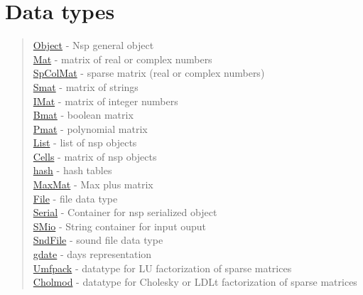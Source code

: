 \chapter*{Data types}


\begin{quote}
\noindent
\hyperlink{Object}{Object} - Nsp general object  \\
\hyperlink{Mat}{Mat} - matrix of real or complex numbers \\
\hyperlink{SpColMat}{SpColMat} - sparse matrix (real or complex numbers) \\
\hyperlink{Smat}{Smat} - matrix of strings  \\
\hyperlink{IMat}{IMat} - matrix of integer numbers \\
\hyperlink{Bmat}{Bmat} - boolean matrix  \\
\hyperlink{Pmat}{Pmat} - polynomial matrix  \\
\hyperlink{list}{List} - list  of nsp objects  \\
\hyperlink{Cells}{Cells} - matrix of nsp objects  \\
\hyperlink{hash}{hash} - hash tables  \\
\hyperlink{MaxMat}{MaxMat} - Max plus matrix  \\
\hyperlink{File}{File} - file data type  \\
\hyperlink{Serial}{Serial} - Container for nsp serialized object \\
\hyperlink{SMio}{SMio} - String container for input ouput \\
\hyperlink{SndFile}{SndFile} - sound file data type \\
\hyperlink{gdate}{gdate} - days representation \\
\hyperlink{Umfpack}{Umfpack} - datatype for LU factorization of sparse matrices \\
\hyperlink{Cholmod}{Cholmod} - datatype for Cholesky or LDLt factorization of sparse matrices \\
\end{quote}


 
 
 
 
 
 
 
 
 
 
 
 
 
 
 
 
 
 

